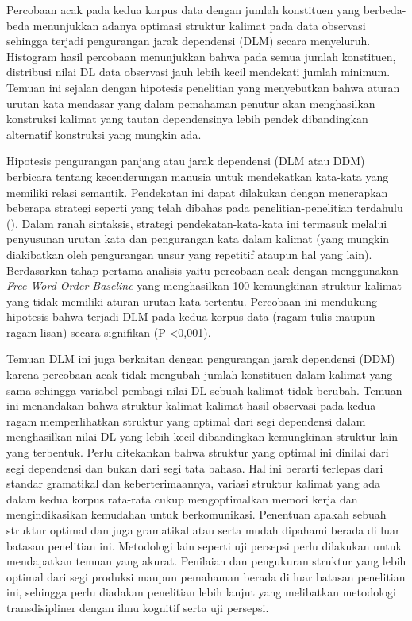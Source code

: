 Percobaan acak pada kedua korpus data dengan jumlah konstituen yang berbeda-beda menunjukkan adanya optimasi struktur kalimat pada data observasi sehingga terjadi pengurangan jarak dependensi (DLM) secara menyeluruh. Histogram hasil percobaan menunjukkan bahwa pada semua jumlah konstituen, distribusi nilai DL data observasi jauh lebih kecil mendekati jumlah minimum. Temuan ini sejalan dengan hipotesis penelitian \cite{hawkins2014cross} yang menyebutkan bahwa aturan urutan kata mendasar yang dalam pemahaman penutur akan menghasilkan konstruksi kalimat yang tautan dependensinya lebih pendek dibandingkan alternatif konstruksi yang mungkin ada.

Hipotesis pengurangan panjang atau jarak dependensi (DLM atau DDM) berbicara tentang kecenderungan manusia untuk mendekatkan kata-kata yang memiliki relasi semantik. Pendekatan ini dapat dilakukan dengan menerapkan beberapa strategi seperti yang telah dibahas pada penelitian-penelitian terdahulu (\citealp{jaeger2006redundancy, gildea2015human}). Dalam ranah sintaksis, strategi pendekatan-kata-kata ini termasuk melalui penyusunan urutan kata dan pengurangan kata dalam kalimat (yang mungkin diakibatkan oleh pengurangan unsur yang repetitif ataupun hal yang lain). Berdasarkan tahap pertama analisis yaitu percobaan acak dengan menggunakan \textit{Free Word Order Baseline} \citep{futrell2015large} yang menghasilkan 100 kemungkinan struktur kalimat yang tidak memiliki aturan urutan kata tertentu. Percobaan ini mendukung hipotesis bahwa terjadi DLM pada kedua korpus data (ragam tulis maupun ragam lisan) secara signifikan (P \textless 0,001). 

Temuan DLM ini juga berkaitan dengan pengurangan jarak dependensi (DDM) karena percobaan acak tidak mengubah jumlah konstituen dalam kalimat yang sama sehingga variabel pembagi nilai DL sebuah kalimat tidak berubah. Temuan ini menandakan bahwa struktur kalimat-kalimat hasil observasi pada kedua ragam memperlihatkan struktur yang optimal dari segi dependensi dalam menghasilkan nilai DL yang lebih kecil dibandingkan kemungkinan struktur lain yang terbentuk. Perlu ditekankan bahwa struktur yang optimal ini dinilai dari segi dependensi dan bukan dari segi tata bahasa. Hal ini berarti terlepas dari standar gramatikal dan keberterimaannya, variasi struktur kalimat yang ada dalam kedua korpus rata-rata cukup mengoptimalkan memori kerja dan mengindikasikan kemudahan untuk berkomunikasi. Penentuan apakah sebuah struktur optimal dan juga gramatikal atau serta mudah dipahami berada di luar batasan penelitian ini. Metodologi lain seperti uji persepsi perlu dilakukan untuk mendapatkan temuan yang akurat. Penilaian dan pengukuran struktur yang lebih optimal dari segi produksi maupun pemahaman berada di luar batasan penelitian ini, sehingga perlu diadakan penelitian lebih lanjut yang melibatkan metodologi transdisipliner dengan ilmu kognitif serta uji persepsi.

